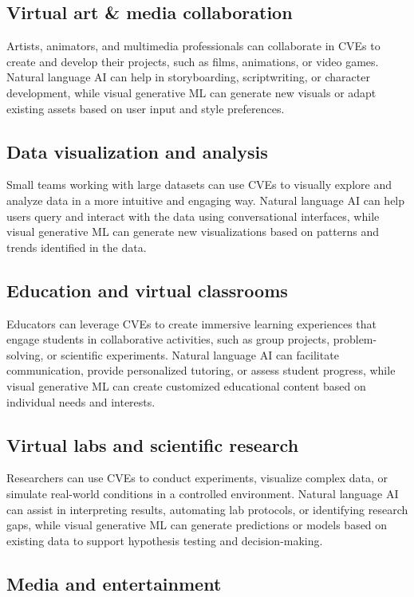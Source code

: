 \subsection{Virtual art \& media collaboration}
Artists, animators, and multimedia professionals can collaborate in CVEs to create and develop their projects, such as films, animations, or video games. Natural language AI can help in storyboarding, scriptwriting, or character development, while visual generative ML can generate new visuals or adapt existing assets based on user input and style preferences.
\subsection{Data visualization and analysis}
Small teams working with large datasets can use CVEs to visually explore and analyze data in a more intuitive and engaging way. Natural language AI can help users query and interact with the data using conversational interfaces, while visual generative ML can generate new visualizations based on patterns and trends identified in the data.
\subsection{Education and virtual classrooms}
    Educators can leverage CVEs to create immersive learning experiences that engage students in collaborative activities, such as group projects, problem-solving, or scientific experiments. Natural language AI can facilitate communication, provide personalized tutoring, or assess student progress, while visual generative ML can create customized educational content based on individual needs and interests.
\subsection{Virtual labs and scientific research}
Researchers can use CVEs to conduct experiments, visualize complex data, or simulate real-world conditions in a controlled environment. Natural language AI can assist in interpreting results, automating lab protocols, or identifying research gaps, while visual generative ML can generate predictions or models based on existing data to support hypothesis testing and decision-making.


\subsection{Media and entertainment}



